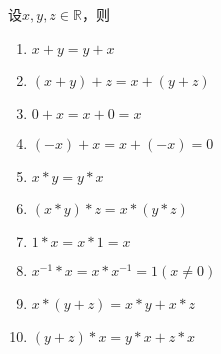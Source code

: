 \documentclass{beamer}
\begin{document}
\begin{CJK*}{UTF8}{gbsn}
\begin{frame}
  
    设$x, y, z \in \mathbb{R}$，则
   \begin{enumerate}
   \item   $x + y = y + x$
   \item   $(x + y) + z = x + (y + z)$
   \item   $0 + x = x + 0 = x$
   \item   $(-x) + x =x + (-x) = 0$
   \item   $x * y = y * x$
   \item   $(x * y) * z = x * (y *z)$
   \item   $1 * x = x * 1 = x$
   \item   $x^{-1} * x = x * x^{-1} = 1(x\neq 0)$
   \item   $x* (y + z) = x * y + x * z$
   \item   $(y + z) * x = y * x + z * x$
    \end{enumerate}
 
\end{frame}



\end{CJK*}
\end{document}
